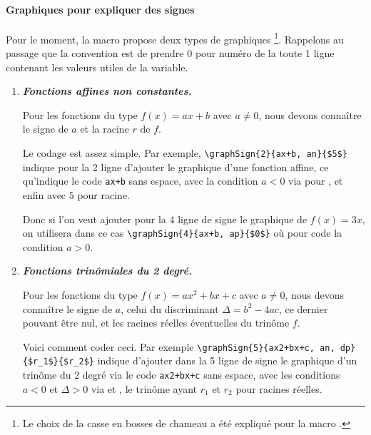 \documentclass[12pt,a4paper]{article}
\begin{document}


\paragraph{Graphiques pour expliquer des signes}

Pour le moment, la macro  propose deux types de graphiques
\footnote{
    Le choix de la casse en bosses de chameau a été expliqué pour la macro .
}.
Rappelons au passage que la convention est de prendre $0$ pour numéro de la toute 1\iere{} ligne contenant les valeurs utiles de la variable.

\begin{enumerate}
    \item \textbf{\itshape Fonctions affines non constantes.}
          
          \smallskip

          Pour les fonctions du type $f(x) = a x + b$ avec $a \neq 0$, nous devons connaître le signe de $a$ et la racine $r$ de $f$.
          
          \smallskip

          Le codage est assez simple.
          Par exemple, \verb#\graphSign{2}{ax+b, an}{$5$}# indique pour la 2\ieme{} ligne d'ajouter le graphique d'une fonction affine, ce qu'indique le code \verb#ax+b# sans espace, avec la condition $a < 0$ via  pour , et enfin avec $5$ pour racine.
          
          \smallskip

          Donc si l'on veut ajouter pour la 4\ieme{} ligne de signe le graphique de $f(x) = 3x$, on utilisera dans ce cas \verb#\graphSign{4}{ax+b, ap}{$0$}# où  pour  code la condition $a > 0$.




    \medskip
    \item \textbf{\itshape Fonctions trinômiales du 2\ieme{} degré.}
          
          \smallskip

          Pour les fonctions du type $f(x) = a x^2 + b x + c$ avec $a \neq 0$, nous devons connaître le signe de $a$, celui du discriminant $\Delta = b^2 - 4ac$, ce dernier pouvant être nul, et les racines réelles éventuelles du trinôme $f$.

          \smallskip

          Voici comment coder ceci.
          Par exemple \verb#\graphSign{5}{ax2+bx+c, an, dp}{$r_1$}{$r_2$}# indique d'ajouter dans la 5\ieme{} ligne de signe le graphique d'un trinôme du 2\ieme{} degré via le code \verb#ax2+bx+c# sans espace, avec les conditions $a < 0$ et $\Delta > 0$ via  et , le trinôme ayant $r_1$ et $r_2$ pour racines réelles.


\end{enumerate}
\end{document}
